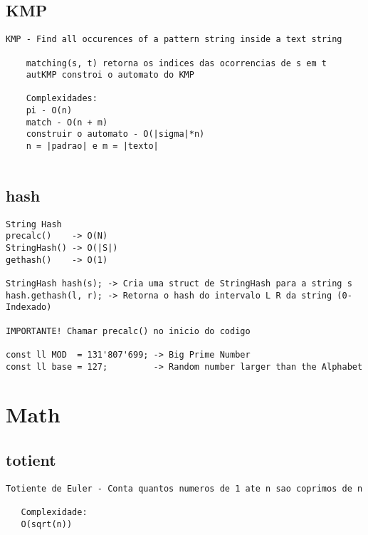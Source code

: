 \subsection{KMP}
\vspace{-4pt}
\begin{lstlisting}[style=description]
    KMP - Find all occurences of a pattern string inside a text string

    matching(s, t) retorna os indices das ocorrencias de s em t
    autKMP constroi o automato do KMP

    Complexidades:
    pi - O(n)
    match - O(n + m)
    construir o automato - O(|sigma|*n)
    n = |padrao| e m = |texto|


\end{lstlisting}
\vspace{-5pt}
\raggedbottom
\hrulefill

\vspace{-2pt}
\subsection{hash}
\vspace{-4pt}
\begin{lstlisting}[style=description]
String Hash
precalc()    -> O(N)
StringHash() -> O(|S|)
gethash()    -> O(1)

StringHash hash(s);	-> Cria uma struct de StringHash para a string s
hash.gethash(l, r); -> Retorna o hash do intervalo L R da string (0-Indexado)

IMPORTANTE! Chamar precalc() no inicio do codigo

const ll MOD  = 131'807'699; -> Big Prime Number 
const ll base = 127;         -> Random number larger than the Alphabet

\end{lstlisting}
\vspace{-5pt}
\raggedbottom
\hrulefill


\section{Math}
\vspace{-2pt}
\subsection{totient}
\vspace{-4pt}
\begin{lstlisting}[style=description]
   Totiente de Euler - Conta quantos numeros de 1 ate n sao coprimos de n

   Complexidade:
   O(sqrt(n))

\end{lstlisting}
\vspace{-5pt}
\raggedbottom
\hrulefill


